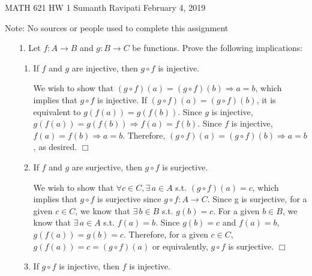 \documentclass[12pt,letterpaper,reqno]{amsart}
\begin{document}
\thispagestyle{empty}
\begin{center}\large{
    MATH 621\quad
    HW 1\quad
    Sumanth Ravipati\quad
    February 4, 2019}
\end{center}
\vspace{.15in}
\begin{flushleft}
Note: No sources or people used to complete this assignment
\end{flushleft}
\vspace{.25in}

\begin{enumerate}
\item[1.] Let $f : A \rightarrow B$ and $g : B \rightarrow C$ be functions. Prove the following implications:\newline
\begin{enumerate}
\item If $f$ and $g$ are injective, then $g \circ f$ is injective.\newline
\begin{flushleft}
We wish to show that $(g \circ f)(a) = (g \circ f)(b) \Rightarrow a = b$, which implies that $g \circ f$ is injective. If $(g \circ f)(a) = (g \circ f)(b)$, it is equivalent to $g(f(a)) = g(f(b))$. Since $g$ is injective, $g(f(a)) = g(f(b)) \Rightarrow f(a) = f(b)$. Since $f$ is injective, $f(a) = f(b) \Rightarrow a = b$. Therefore, $(g \circ f)(a) = (g \circ f)(b) \Rightarrow a = b$, as desired. $\Box$
\newline
\end{flushleft}
\item If $f$ and $g$ are surjective, then $g \circ f$ is surjective.\newline
\begin{flushleft}
We wish to show that $\forall c \in C, \exists\, a \in A$ s.t. $(g \circ f)(a) = c$, which implies that $g \circ f$ is surjective since $g \circ f: A \rightarrow C$. Since g is surjective, for a given $c \in C$, we know that $\exists\, b \in B$ s.t. $g(b) = c$. For a given $b \in B$, we know that $\exists\, a \in A$ s.t. $f(a) = b$. Since $g(b) = c$ and $f(a) = b$, $g(f(a)) = g(b) = c$. Therefore, for a given $c \in C$, $g(f(a)) = c = (g \circ f)(a)$ or equivalently, $g \circ f$ is surjective. $\Box$
\newline
\end{flushleft}
\item If $g \circ f$ is injective, then $f$ is injective.\newline
\begin{flushleft}

\end{flushleft}
\end{enumerate}
\end{enumerate}
\end{document}
